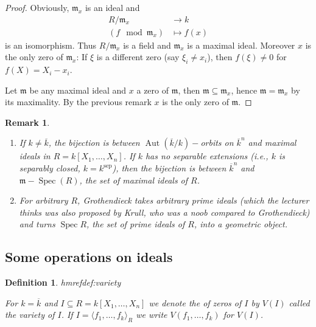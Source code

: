 \documentclass[DIV=14,parskip=full,pointednumbers]{scrartcl}
\newenvironment{alphanumerate}{\begin{enumerate}[label={\upshape(\alph*)}]}{\end{enumerate}}
\theoremstyle{cthm}
\theoremstyle{cdef}
\newtheorem{defi}{Definition}[subsection]
\newtheorem{rem}{Remark}[subsection]
\newcommand{\lbl}[1]{
	\label{#1}
	\edef\dummy{\curthm}
	\expandafter\xdef\csname thmref#1\endcsname{\dummy}
}
\newcommand{\mm}{\mathfrak{m}}
\newcommand{\Aut}{\operatorname{Aut}}
\newcommand{\longto}{\longrightarrow}
\begin{document}
\begin{proof}
 Obviously, $\mm_x$ is an ideal and
 \begin{align*}
  R/\mm_x &\longto k\\
  (f\mod \mm_x) &\longmapsto f(x)
 \end{align*}
is an isomorphism. Thus $R/\mm_x$ is a field and $\mm_x$ is a maximal ideal. Moreover $x$ is the only zero of $\mm_x$: If $\xi$ is a different zero (say $\xi_i\neq x_i$), then $f(\xi)\neq 0$ for $f(X) = X_i-x_i$.

Let $\mm$ be any maximal ideal and $x$ a zero of $\mm$, then $\mm\subseteq\mm_x$, hence $\mm=\mm_x$ by its maximality. By the previous remark $x$ is the only zero of $\mm$.
\end{proof}
\begin{rem}
 \begin{alphanumerate}
  \item If $k\neq\overline{k}$, the bijection is between $\Aut(\overline{k}/k)-$orbits on $\overline{k}^n$ and maximal ideals in $R=k[X_1,\ldots,X_n]$. If $k$ has no separable extensions (i.e., $k$ is \emph{separably closed}, $k=k^{\operatorname{sep}}$), then the bijection is between $\overline{k}^n$ and $\mm-\operatorname{Spec}(R)$, the set of maximal ideals of $R$.
  \item For arbitrary $R$, Grothendieck takes arbitrary prime ideals (which the lecturer thinks was also proposed by Krull, who was a noob compared to Grothendieck) and turns $\operatorname{Spec} R$, the set of prime ideals of $R$, into a geometric object.
 \end{alphanumerate}

\end{rem}


\subsection{Some operations on ideals}\label{sec:operationsOnIdeals}
\begin{defi}\lbl{def:variety}
 For $k=\overline{k}$ and $I\subseteq R = k[X_1,\ldots,X_n]$ we denote the of zeros of $I$ by $V(I)$ called the \emph{variety} of $I$. If $I=\langle f_1,\ldots,f_k\rangle_R$ we write $V(f_1,\ldots,f_k)$ for $V(I)$.
\end{defi}
\end{document}
